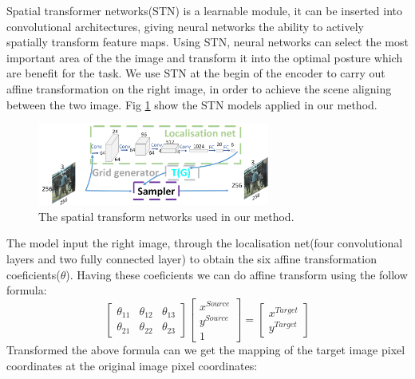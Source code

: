 \documentclass{IEEE_lsens}
\begin{document}
Spatial transformer networks(STN) \cite{Jaderberg2015::Spatial} is a learnable module, it can be inserted into convolutional architectures, giving neural networks the ability to actively spatially transform feature maps. Using STN, neural networks can select the most important area of the the image and transform it into the optimal posture which are benefit for the task. We use STN at the begin of the encoder to carry out affine transformation on the right image, in order to achieve the scene aligning between the two image. Fig \ref{fig:stn} show the STN models applied in our method.
\begin{figure}[!t]
\centering
\includegraphics[width=3.0in]{stn}
\caption{The spatial transform networks used in our method.}
\label{fig:stn}
\end{figure}
The model input the right image, through the localisation net(four convolutional layers and two fully connected layer) to obtain the six affine transformation coeficients($\theta$). Having these coeficients we can do affine transform using the follow formula:
\begin{equation}
    \left [ \begin{array}{ccc}
             \theta_{11} & \theta_{12} & \theta_{13} \\
             \theta_{21} & \theta_{22} & \theta_{23}
           \end{array}
    \right ]
    \left [ \begin{array}{c}
              x^{Source} \\
              y^{Source} \\
              1
            \end{array}
    \right ]
    =
    \left [ \begin{array}{c}
              x^{Target} \\
              y^{Target}
            \end{array}
    \right ]
\end{equation}
Transformed the above formula can we get the mapping of the target image pixel coordinates at the original image pixel coordinates:
\end{document}
